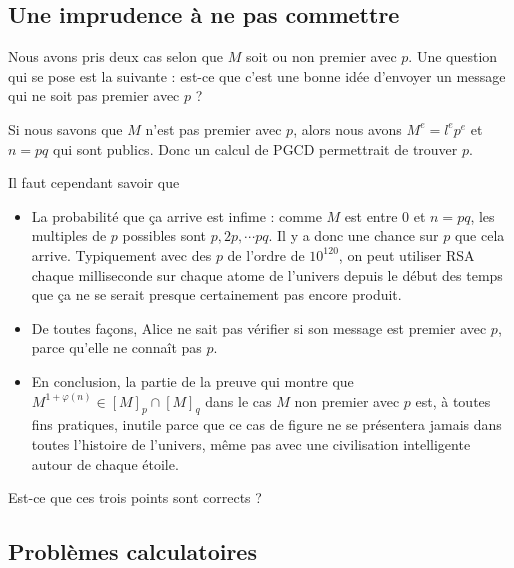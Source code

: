 \subsection{Une imprudence à ne pas commettre}

Nous avons pris deux cas selon que \( M\) soit ou non premier avec \( p\). Une question qui se pose est la suivante : est-ce que c'est une bonne idée d'envoyer un message qui ne soit pas premier avec \( p\) ?

Si nous savons que \( M\) n'est pas premier avec \( p\), alors nous avons \( M^e=l^ep^e\) et \( n=pq\) qui sont publics. Donc un calcul de PGCD permettrait de trouver \( p\).

Il faut cependant savoir que \label{PageAKTBooMDeQxY}
\begin{itemize}
	\item La probabilité que ça arrive est infime : comme \( M\) est entre \( 0\) et \( n=pq\), les multiples de \( p\) possibles sont \( p,2p,\cdots pq\). Il y a donc une chance sur \( p\) que cela arrive. Typiquement avec des \( p\) de l'ordre de \( 10^{120}\), on peut utiliser RSA chaque milliseconde sur chaque atome de l'univers depuis le début des temps que ça ne se serait presque certainement pas encore produit.
	\item
	      De toutes façons, Alice ne sait pas vérifier si son message est premier avec \( p\), parce qu'elle ne connaît pas \( p\).
	\item
	      En conclusion, la partie de la preuve qui montre que \( M^{1+\varphi(n)}\in [M]_p\cap[M]_q\) dans le cas \( M\) non premier avec \( p\) est, à toutes fins pratiques, inutile parce que ce cas de figure ne se présentera jamais dans toutes l'histoire de l'univers, même pas avec une civilisation intelligente autour de chaque étoile.
\end{itemize}

\begin{probleme}\label{ProbGAYFooZATuYy}
	Est-ce que ces trois points sont corrects ?
\end{probleme}

\subsection{Problèmes calculatoires}

